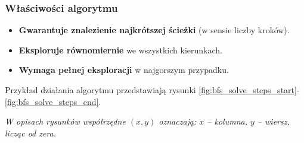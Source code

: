 \documentclass[../../../../doc.tex]{subfiles}
\begin{document}
\subsubsection{Właściwości algorytmu}
\begin{itemize}
  \item \textbf{Gwarantuje znalezienie najkrótszej ścieżki} (w sensie liczby kroków).
  \item \textbf{Eksploruje równomiernie} we wszystkich kierunkach.
  \item \textbf{Wymaga pełnej eksploracji} w najgorszym przypadku.
\end{itemize}

\noindent Przykład działania algorytmu przedstawiają rysunki \ref{fig:bfs_solve_steps_start}-\ref{fig:bfs_solve_steps_end}.

\vspace{8pt}
\noindent \textit{W opisach rysunków współrzędne \( (x, y) \) oznaczają: \( x \) – kolumna, \( y \) – wiersz, licząc od zera.}

  
\end{document}
